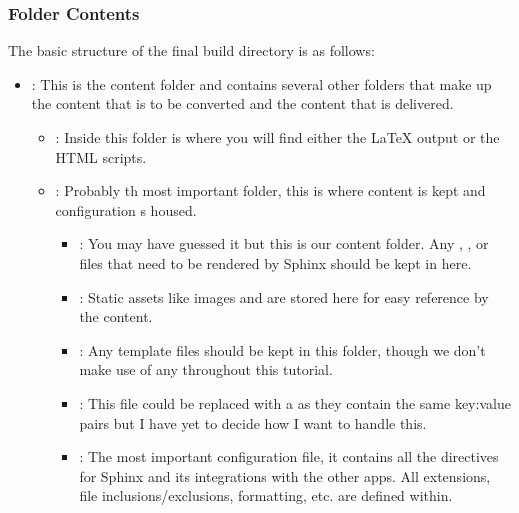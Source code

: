 \documentclass[letterpaper,12pt,english]{sphinxmanual}
\begin{document}
\subsubsection{Folder Contents}
\label{\detokenize{_notebooks/00-the-goal:folder-contents}}
\sphinxAtStartPar
The basic structure of the final build directory is as follows:
\begin{itemize}
\item {} 
\sphinxAtStartPar
{} : This is the content folder and contains several other folders that make up the content that is to be converted and the content that is delivered.
\begin{itemize}
\item {} 
\sphinxAtStartPar
{} : Inside this folder is where you will find either the LaTeX output or the HTML scripts.

\item {} 
\sphinxAtStartPar
{} : Probably th most important folder, this is where content is kept and configuration s housed.
\begin{itemize}
\item {} 
\sphinxAtStartPar
{} : You may have guessed it but this is our content folder. Any , , or  files that need to be rendered by Sphinx should be kept in here.

\item {} 
\sphinxAtStartPar
{} : Static assets like images and  are stored here for easy reference by the content.

\item {} 
\sphinxAtStartPar
{} : Any template files should be kept in this folder, though we don’t make use of any throughout this tutorial.

\item {} 
\sphinxAtStartPar
{} : This file could be replaced with a  as they contain the same key:value pairs but I have yet to decide how I want to handle this.

\item {} 
\sphinxAtStartPar
{} : The most important configuration file, it contains all the directives for Sphinx and its integrations with the other apps. All extensions, file inclusions/exclusions, formatting, etc. are defined within.


\end{itemize}
\end{itemize}
\end{itemize}
\end{document}
